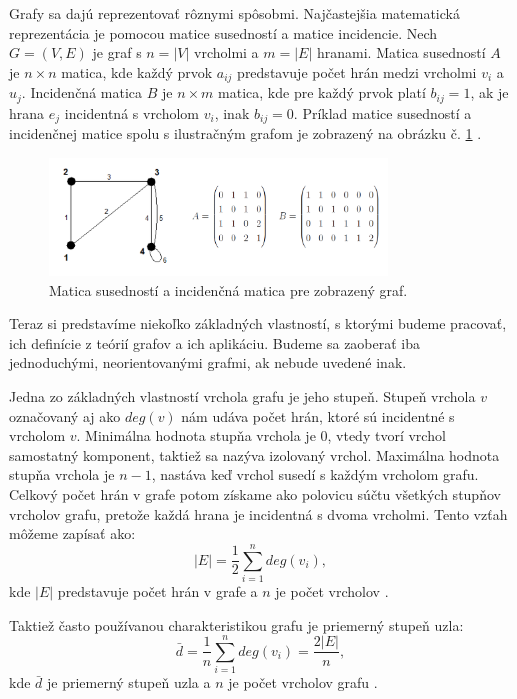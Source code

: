 Grafy sa dajú reprezentovať rôznymi spôsobmi. Najčastejšia matematická reprezentácia je pomocou matice susedností a matice incidencie.
Nech $G = (V, E)$ je graf s $n = |V|$ vrcholmi a $m = |E|$ hranami. Matica susedností $A$ je $n \times n$ matica, kde každý prvok $a_{ij}$
predstavuje počet hrán medzi vrcholmi $v_i$ a $u_j$. Incidenčná matica $B$ je $n \times m$ matica, kde pre každý prvok platí $b_{ij} = 1$,
ak je hrana $e_j$ incidentná s vrcholom $v_i$, inak $b_{ij} = 0$.
Príklad matice susedností a incidenčnej matice spolu s ilustračným grafom je zobrazený na obrázku č. \ref{obr:matrices} .

\begin{figure}
    \centerline{\includegraphics[width=0.8\textwidth]{images/matrices.png}}
    \caption[Matica susedností a incidenčná matica.]{Matica susedností a incidenčná matica pre zobrazený graf.}
    \label{obr:matrices}
\end{figure}

Teraz si predstavíme niekoľko základných vlastností, s ktorými budeme pracovať, ich definície z teórií grafov a ich aplikáciu. Budeme sa zaoberať iba
jednoduchými, neorientovanými grafmi, ak nebude uvedené inak.

Jedna zo základných vlastností vrchola grafu je jeho stupeň. Stupeň vrchola $v$ označovaný aj ako $deg(v)$ nám udáva počet hrán,
ktoré sú incidentné s vrcholom $v$. Minimálna hodnota stupňa vrchola je $0$, vtedy tvorí vrchol samostatný komponent, taktiež sa
nazýva izolovaný vrchol. Maximálna hodnota stupňa vrchola je $n-1$, nastáva keď vrchol susedí s každým vrcholom grafu.
Celkový počet hrán v grafe potom získame ako polovicu súčtu všetkých stupňov vrcholov grafu,
pretože každá hrana je incidentná s dvoma vrcholmi. Tento vzťah môžeme zapísať ako:
\begin{equation}
    |E| = \frac{1}{2} \sum_{i=1}^{n} deg(v_i),
    \label{eq:pocet_hran}
\end{equation}
kde $|E|$ predstavuje počet hrán v grafe a $n$ je počet vrcholov \cite{barabasi2016network} .

Taktiež často používanou charakteristikou grafu je priemerný stupeň uzla:
\begin{equation}
    \bar{d} = \frac{1}{n} \sum_{i=1}^{n} deg(v_i) = \frac{2|E|}{n},
    \label{eq:priemerny_stupen}
\end{equation}
kde $\bar{d}$ je priemerný stupeň uzla a $n$ je počet vrcholov grafu \cite{barabasi2016network} .

